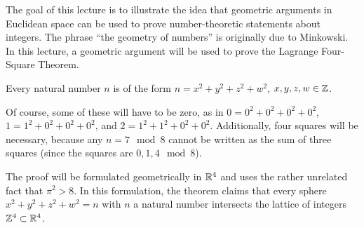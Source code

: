 %
\label{geoofnum}
The goal of this lecture is to illustrate the idea that geometric arguments in Euclidean space can be used to prove number-theoretic statements about integers. The phrase ``the geometry of numbers'' is originally due to Minkowski. In this lecture, a geometric argument will be used to prove the Lagrange Four-Square Theorem.

\begin{thm}
\label{foursquare}
Every natural number $n$ is of the form $n = x^2+y^2+z^2+w^2$, $x,y,z,w\in\mathbb{Z}$.
\end{thm}
Of course, some of these will have to be zero, as in $0 = 0^2+0^2+0^2+0^2$, $1 = 1^2 + 0^2+0^2+0^2$, and $2 = 1^2+1^2+0^2+0^2$. Additionally, four squares will be necessary, because any $n = 7\mod 8$ cannot be written as the sum of three squares (since the squares are $0,1,4\mod 8$).

The proof will be formulated geometrically in $\mathbb{R}^4$ and uses the rather unrelated fact that $\pi^2 > 8$. In this formulation, the theorem claims that every sphere $x^2+y^2+z^2+w^2 = n$ with $n$ a natural number intersects the lattice of integers $\mathbb{Z}^4 \subset\mathbb{R}^4$.

